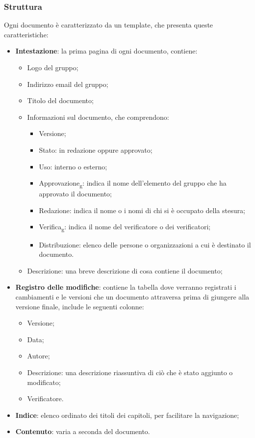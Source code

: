         \subsubsection{Struttura}
        Ogni documento è caratterizzato da un template, che presenta queste caratteristiche:
        \begin{itemize}
            \item \textbf{Intestazione}: la prima pagina di ogni documento, contiene:
            \begin{itemize}
                \item Logo del gruppo;
                \item Indirizzo email del gruppo;
                \item Titolo del documento;
                \item Informazioni sul documento, che comprendono:
                \begin{itemize}
                    \item Versione;
                    \item Stato: in redazione oppure approvato;
                    \item Uso: interno o esterno;
                    \item Approvazione\textsubscript{g}: indica il nome dell'elemento del gruppo che ha approvato il documento;
                    \item Redazione: indica il nome o i nomi di chi si è occupato della stesura;
                    \item Verifica\textsubscript{g}: indica il nome del verificatore o dei verificatori;
                    \item Distribuzione: elenco delle persone o organizzazioni a cui è destinato il documento.
                \end{itemize}
                \item Descrizione: una breve descrizione di cosa contiene il documento;
            \end{itemize}
            \item \textbf{Registro delle modifiche}: contiene la tabella dove verranno registrati i cambiamenti e le versioni che un documento attraversa prima di giungere alla versione finale, include le seguenti colonne:
            \begin{itemize}
                \item Versione;
                \item Data;
                \item Autore;
                \item Descrizione: una descrizione riassuntiva di ciò che è stato aggiunto o modificato;
                \item Verificatore.
            \end{itemize}
            \item \textbf{Indice}: elenco ordinato dei titoli dei capitoli, per facilitare la navigazione;
            \item \textbf{Contenuto}: varia a seconda del documento.
        \end{itemize}

